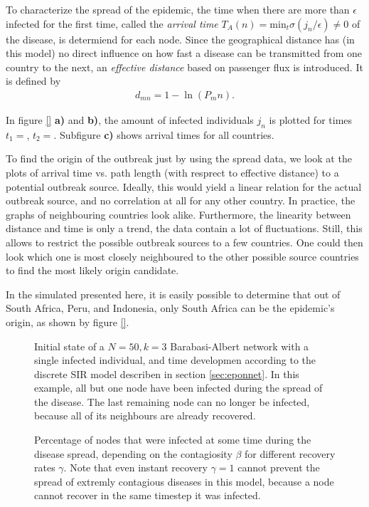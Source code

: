 \documentclass{scrartcl}
\begin{document}
To characterize the spread of the epidemic, the time when there are more than $\epsilon$ infected for the first time, called the \emph{arrival time} $T_A(n) = \mathrm{min}_t \sigma(j_n / \epsilon) \neq 0$ of the disease, is determiend for each node. Since the geographical distance has (in this model) no direct influence on how fast a disease can be transmitted from one country to the next, an \emph{effective distance} based on passenger flux is introduced. It is defined by
\begin{align}
	d_{mn} = 1 - \ln (P_mn).
\end{align}

In figure \ref{} \textbf{a)} and \textbf{b)}, the amount of infected individuals $j_n$ is plotted for times $t_1=$, $t_2 = $. Subfigure \textbf{c)} shows arrival times for all countries.

To find the origin of the outbreak just by using the spread data, we look at the plots of arrival time vs. path length (with resprect to effective distance) to a potential outbreak source. 
Ideally, this would yield a linear relation for the actual outbreak source, and no correlation at all for any other country. In practice, the graphs of neighbouring countries look alike. 
Furthermore, the linearity between distance and time is only a trend, the data contain a lot of fluctuations.
Still, this allows to restrict the possible outbreak sources to a few countries. One could then look which one is most closely neighboured to the other possible source countries to find the most likely origin candidate.

In the simulated presented here, it is easily possible to determine that out of South Africa, Peru, and Indonesia, only South Africa can be the epidemic's origin, as shown by figure \ref{}.
\begin{figure}
    \centering
    \def\svgwidth{0.9\textwidth}
    
    \caption{Initial state of a $N=50, k=3$ Barabasi-Albert network with a single infected individual, and time developmen according to the discrete SIR model describen in section \ref{sec:eponnet}. In this example, all but one node have been infected during the spread of the disease. The last remaining node can no longer be infected, because all of its neighbours are already recovered.}
    \label{fig:D11}
\end{figure}

\begin{figure}
    \centering
    \caption{Percentage of nodes that were infected at some time during the disease spread, 
		depending on the contagiosity $\beta$ for different recovery rates $\gamma$. Note that 
		even instant recovery $\gamma=1$ cannot prevent the spread of extremly contagious diseases
		in this model, because a node cannot recover in the same timestep it was infected.}
    \label{fig:D12}
\end{figure}
\end{document}
